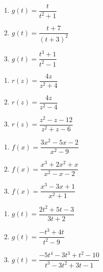 \documentclass{ximera}
\begin{document}
\begin{multicols}{3}
\begin{enumerate}
\setcounter{enumi}{\value{HW}}

\item $g(t) = \dfrac{t}{t^{2} + 1}$
\item $g(t) = \dfrac{t + 7}{(t + 3)^{2}}$
\item $g(t) = \dfrac{t^{3} + 1}{t^{2} - 1}$

\setcounter{HW}{\value{enumi}}
\end{enumerate}
\end{multicols}

\begin{multicols}{3}
\begin{enumerate}
\setcounter{enumi}{\value{HW}}

\item $r(z) = \dfrac{4z}{z^2+4}$
\item $r(z) = \dfrac{4z}{z^2-4}$
\item $r(z) = \dfrac{z^2-z-12}{z^2+z-6}$

\setcounter{HW}{\value{enumi}}
\end{enumerate}
\end{multicols}

\begin{multicols}{3}
\begin{enumerate}
\setcounter{enumi}{\value{HW}}

\item $f(x) = \dfrac{3x^2-5x-2}{x^2-9}$
\item $f(x) = \dfrac{x^3+2x^2+x}{x^2-x-2}$
\item $f(x) = \dfrac{x^{3} - 3x + 1}{x^{2} + 1}$

\setcounter{HW}{\value{enumi}}
\end{enumerate}
\end{multicols}

\begin{multicols}{3}
\begin{enumerate}
\setcounter{enumi}{\value{HW}}

\item $g(t) = \dfrac{2t^{2} + 5t - 3}{3t + 2}$
\item $g(t) = \dfrac{-t^{3} + 4t}{t^{2} - 9}$
\item \small $g(t) = \dfrac{-5t^{4} - 3t^{3} + t^{2} - 10}{t^{3} - 3t^{2} + 3t - 1}$ \normalsize

\setcounter{HW}{\value{enumi}}
\end{enumerate}
\end{multicols}
\end{document}
